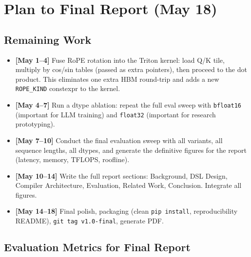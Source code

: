 \documentclass[12pt]{article}
\begin{document}
\section{Plan to Final Report (May 18)}

\subsection{Remaining Work}

\begin{itemize}[leftmargin=1.5em]
  \item \textbf{[May 1--4]} Fuse RoPE rotation into the Triton kernel: load
    Q/K tile, multiply by cos/sin tables (passed as extra pointers), then
    proceed to the dot product.  This eliminates one extra HBM round-trip and
    adds a new \texttt{ROPE\_KIND} constexpr to the kernel.

  \item \textbf{[May 4--7]} Run a dtype ablation: repeat the full eval sweep
    with \texttt{bfloat16} (important for LLM training) and \texttt{float32}
    (important for research prototyping).

  \item \textbf{[May 7--10]} Conduct the final evaluation sweep with all
    variants, all sequence lengths, all dtypes, and generate the definitive
    figures for the report (latency, memory, TFLOPS, roofline).

  \item \textbf{[May 10--14]} Write the full report sections: Background,
    DSL Design, Compiler Architecture, Evaluation, Related Work, Conclusion.
    Integrate all figures.

  \item \textbf{[May 14--18]} Final polish, packaging (clean
    \texttt{pip install}, reproducibility README), \texttt{git tag
    v1.0-final}, generate PDF.
\end{itemize}

\subsection{Evaluation Metrics for Final Report}
\end{document}
